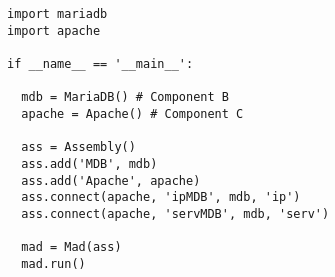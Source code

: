 \begin{lstlisting}[label=codeass,caption=Madeus code of the assembly
  of Figure~\ref{fig:example}.]
import mariadb
import apache

if __name__ == '__main__':

  mdb = MariaDB() # Component B
  apache = Apache() # Component C

  ass = Assembly()
  ass.add('MDB', mdb)
  ass.add('Apache', apache)
  ass.connect(apache, 'ipMDB', mdb, 'ip')
  ass.connect(apache, 'servMDB', mdb, 'serv')

  mad = Mad(ass)
  mad.run()
\end{lstlisting}
